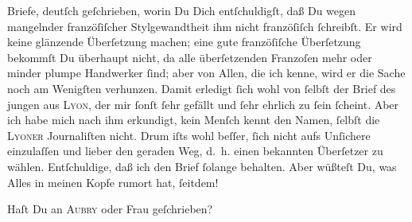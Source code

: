                Briefe, deutſch geſchrieben, worin Du Dich entſchuldigſt, daß Du wegen mangelnder
               franzöſiſcher Stylgewandtheit ihm nicht franzöſiſch{ }ſchreibſt. Er wird keine
               glänzende Überſetzung machen; eine gute franzöſiſche Überſetzung bekommſt Du
               überhaupt nicht, da alle überſetzenden Franzoſen mehr oder minder plumpe Handwerker{ }ſind; aber von Allen, die ich kenne, {\pb}wird er die
               Sache noch am Wenigſten verhunzen. Damit erledigt{ }ſich wohl von{ }ſelbſt der Brief des
               jungen \label{K_L02758-3v}\label{K_L02758-3} aus \textsc{Lyon}, der mir{ }ſonſt{ }ſehr gefällt und{ }ſehr ehrlich zu{ }ſein{ }ſcheint. Aber ich habe
               mich nach ihm erkundigt, kein Menſch kennt den Namen,{ }ſelbſt die \textsc{Lyoner} Journaliſten nicht.  Drum iſts wohl beſſer,{ }ſich nicht aufs Unſichere einzulaſſen und lieber den
               geraden Weg, d. h. einen bekannten Überſetzer zu wählen. Entſchuldige, daß ich den Brief{ }ſolange behalten. Aber
               wüßteſt Du, was Alles in meinen Kopfe rumort hat,{ }ſeitdem!\pend
           
\pstart
           {\pb}Haſt Du an \textsc{Aubry} oder Frau
               geſchrieben?\pend
           

